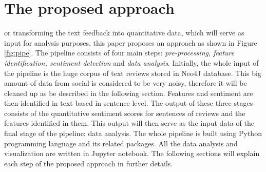 
%
%
\let\textcircled=\pgftextcircled
\chapter{The proposed approach}



\label{chap:prop}

or transforming the text feedback into quantitative data, which will serve as input for analysis purposes, this paper proposes an approach as shown in Figure \ref{fig:pipe}. The pipeline consists of four main steps: \textit{pre-processing, feature identification, sentiment detection}  and \textit{data analysis}. Initially, the whole input of the pipeline is the huge corpus of text reviews stored in Neo4J database. This big amount of data from social is considered to be very noisy, therefore it will be cleaned up as be described in the following section. Features and sentiment are then identified in text based in sentence level. The output of these three stages consists of the quantitative sentiment scores for sentences of reviews and the features identified in them. This output will then serve as the input data of the final stage of the pipeline: data analysis.  
The whole pipeline is built using Python programming language and its related packages. All the data analysis and visualization are written in Jupyter notebook. The following sections will explain each step of the proposed approach in further details.
%
%
%
